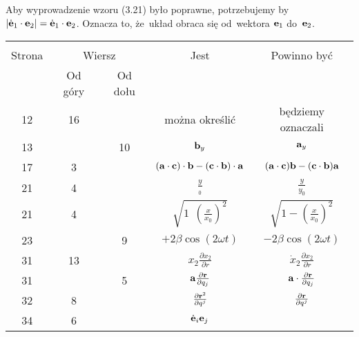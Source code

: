 \documentclass[a4paper,11pt]{article}
\begin{document}
\vspace{\spaceFour}



\start {} Aby wyprowadzenie wzoru (3.21) było poprawne,
potrzebujemy by
$| \dot{ \mathbf{e} }_{ 1 } \cdot \mathbf{e}_{ 2 } | = \dot{ \mathbf{e} }_{ 1 }
\cdot \mathbf{e}_{ 2 }$. Oznacza to, że~układ obraca się od~wektora
$\mathbf{e}_{ 1 }$ do~$\mathbf{e}_{ 2 }$.







\begin{center}

  \begin{tabular}{|c|c|c|c|c|}
    \hline
    & \multicolumn{2}{c|}{} & & \\
    Strona & \multicolumn{2}{c|}{Wiersz} & Jest
                              & Powinno być \\ \cline{2-3}
    & Od góry & Od dołu & & \\
    \hline
    12  & 16 & & można określić & będziemy oznaczali \\
    13  & & 10 & $\mathbf{b}_{ y }$ & $\mathbf{a}_{ y }$ \\
    17  &  3 & & $( \mathbf{a} \cdot \mathbf{c} ) \cdot \mathbf{b}
                 - ( \mathbf{c} \cdot \mathbf{b} ) \cdot \mathbf{a}$
           & $( \mathbf{a} \cdot \mathbf{c} ) \mathbf{b}
             - ( \mathbf{c} \cdot \mathbf{b} ) \mathbf{a}$ \\
    21  &  4 & & $\frac{ y }{ { }_{ 0 } }$ & $\frac{ y }{ { y }_{ 0 } }$ \\
    21  &  4 & & $\sqrt{ 1 \:\: \left( \frac{ x }{ x_{ 0 } } \right)^{ 2 } }$
           & $\sqrt{ 1 - \left( \frac{ x }{ x_{ 0 } } \right)^{ 2 } } $ \\
    23  & &  9 & $+2\beta \cos( 2\omega t )$ & $-2\beta \cos( 2\omega t )$ \\
    31  & 13 & & $x_{ 2 } \frac{ \partial x_{ 2 } }{ \partial r }$
           & $\dot{ x }_{ 2 } \frac{ \partial x_{ 2 } }{ \partial r }$ \\
    31  & &  5 & $\mathbf{a} \frac{ \partial \mathbf{r} }{ \partial q_{ j } }$
           & $\mathbf{a} \cdot \frac{ \partial \mathbf{r} }{ \partial q_{ j } }$ \\
    32  &  8 & & $\frac{ \partial \mathbf{r}^{ 2 } }{ \partial { q^{ j } } }$
           & $\frac{ \partial \mathbf{r} }{ \partial { q^{ j } } }$ \\
    34  &  6 & & $\dot{ \mathbf{e} }_{ i } \mathbf{e}_{ j }$

\end{tabular}
\end{center}
\end{document}
